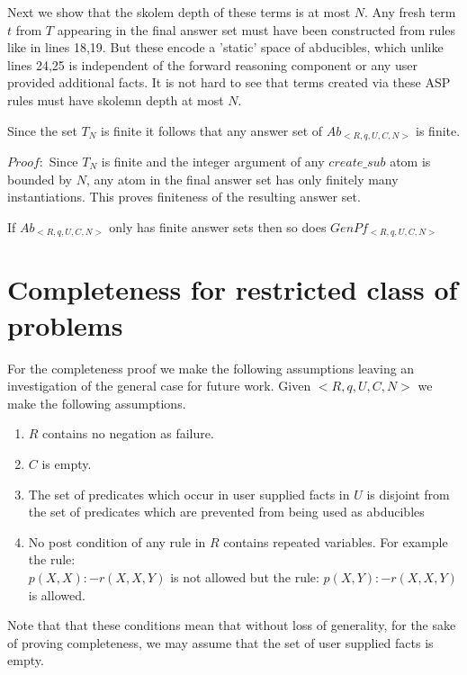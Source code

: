 \documentclass[sigconf]{acmart}
\begin{document}
Next we show that the skolem depth of these terms is at most $N$. Any fresh term $t$ from $T$ appearing in the final answer set must have been constructed from rules like in lines 18,19. But these encode a 'static' space of abducibles, which unlike lines 24,25 is independent of the forward reasoning component or any user provided additional facts. It is not hard to see that terms created via these ASP rules must have skolemn depth at most $N$. 
\begin{lemma}
Since the set $T_{N}$ is finite it follows that any answer set of $Ab_{<R,q,U,C,N>}$ is finite.\\
\end{lemma}

$Proof:$ Since $T_{N}$ is finite and the integer argument of any $create\_sub$ atom is bounded by $N$, any atom in the final answer set has only finitely many instantiations. This proves finiteness of the resulting answer set. 
\begin{lemma}
If $Ab_{<R,q,U,C,N>}$ only has finite answer sets then so does $GenPf_{<R,q,U,C,N>}$
\end{lemma}

\section{Completeness for restricted class of problems}\label{sec:completeness}
For the completeness proof we make the following assumptions leaving an investigation of the general case for future work. Given $<R,q,U,C,N>$ we make the following assumptions.

\begin{enumerate}
\item $R$ contains no negation as failure.
\item $C$ is empty.
\item The set of predicates which occur in user supplied facts in $U$ is
  disjoint from the set of predicates which are prevented from being used as
  abducibles
\item No post condition of any rule in $R$ contains repeated variables. For example the rule:\\
$p(X,X):-r(X,X,Y)$ is not allowed but the rule: $p(X,Y):-r(X,X,Y)$ is allowed.
\end{enumerate}

Note that that these conditions mean that without loss of generality, for the sake of proving completeness, we may assume that the set of user supplied facts is empty.
\end{document}

